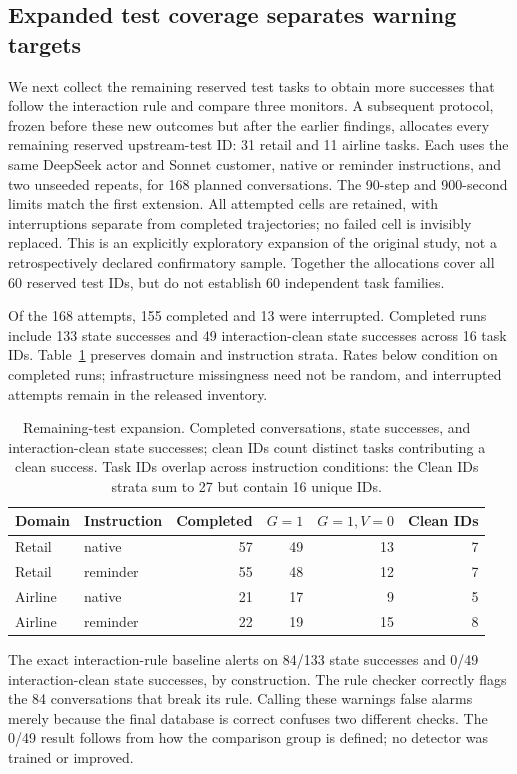 \subsection{Expanded test coverage separates warning targets}
\label{sec:replication}
We next collect the remaining reserved test tasks to obtain more successes that follow the interaction rule and compare three monitors. A subsequent protocol, frozen before these new outcomes but after the earlier findings, allocates every remaining reserved upstream-test ID: 31 retail and 11 airline tasks. Each uses the same DeepSeek actor and Sonnet customer, native or reminder instructions, and two unseeded repeats, for 168 planned conversations. The 90-step and 900-second limits match the first extension. All attempted cells are retained, with interruptions separate from completed trajectories; no failed cell is invisibly replaced. This is an explicitly exploratory expansion of the original study, not a retrospectively declared confirmatory sample. Together the allocations cover all 60 reserved test IDs, but do not establish 60 independent task families.

Of the 168 attempts, 155 completed and 13 were interrupted. Completed runs include 133 state successes and 49 interaction-clean state successes across 16 task IDs. Table~\ref{tab:replication-cohort} preserves domain and instruction strata. Rates below condition on completed runs; infrastructure missingness need not be random, and interrupted attempts remain in the released inventory.

\begin{table}[t]\centering\small
\caption{Remaining-test expansion. Completed conversations, state successes, and interaction-clean state successes; clean IDs count distinct tasks contributing a clean success. Task IDs overlap across instruction conditions: the Clean IDs strata sum to 27 but contain 16 unique IDs.}\label{tab:replication-cohort}
\begin{tabular}{llrrrr}
\toprule
Domain & Instruction & Completed & $G=1$ & $G=1,V=0$ & Clean IDs\\
\midrule
Retail & native & 57 & 49 & 13 & 7\\
Retail & reminder & 55 & 48 & 12 & 7\\
Airline & native & 21 & 17 & 9 & 5\\
Airline & reminder & 22 & 19 & 15 & 8\\
\bottomrule
\end{tabular}
\end{table}
The exact interaction-rule baseline alerts on 84/133 state successes and 0/49 interaction-clean state successes, by construction. The rule checker correctly flags the 84 conversations that break its rule. Calling these warnings false alarms merely because the final database is correct confuses two different checks. The 0/49 result follows from how the comparison group is defined; no detector was trained or improved.

